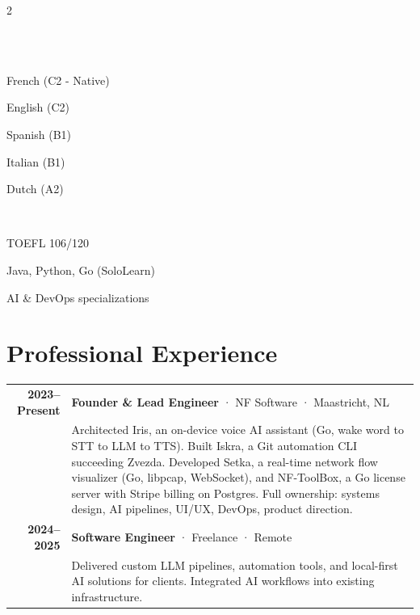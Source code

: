 \documentclass[lighthipster]{simplehipstercv}
\begin{document}
\begin{paracol}{2}
{\vspace{1em}

\\[0.5em]




\bigskip

\\[0.5em]

French (C2 - Native)

English (C2)

Spanish (B1)

Italian (B1)

Dutch (A2)

\bigskip

\\[0.5em]

{\footnotesize TOEFL 106/120

Java, Python, Go (SoloLearn)

AI \& DevOps specializations}

\vfill

}
\switchcolumn

\small
\section*{Professional Experience}

\begin{tabular}{r| p{}}
    \textbf{2023--Present} & \textbf{Founder \& Lead Engineer} · \textcolor{cvgreen}{NF Software} · Maastricht, NL \\
    & {\footnotesize Architected Iris, an on-device voice AI assistant (Go, wake word to STT to LLM to TTS). Built Iskra, a Git automation CLI succeeding Zvezda. Developed Setka, a real-time network flow visualizer (Go, libpcap, WebSocket), and NF-ToolBox, a Go license server with Stripe billing on Postgres. Full ownership: systems design, AI pipelines, UI/UX, DevOps, product direction.} \\[0.8em]
    
    \textbf{2024--2025} & \textbf{Software Engineer} · \textcolor{cvgreen}{Freelance} · Remote \\
    & {\footnotesize Delivered custom LLM pipelines, automation tools, and local-first AI solutions for clients. Integrated AI workflows into existing infrastructure.} \\
\end{tabular}


\end{paracol}
\end{document}
